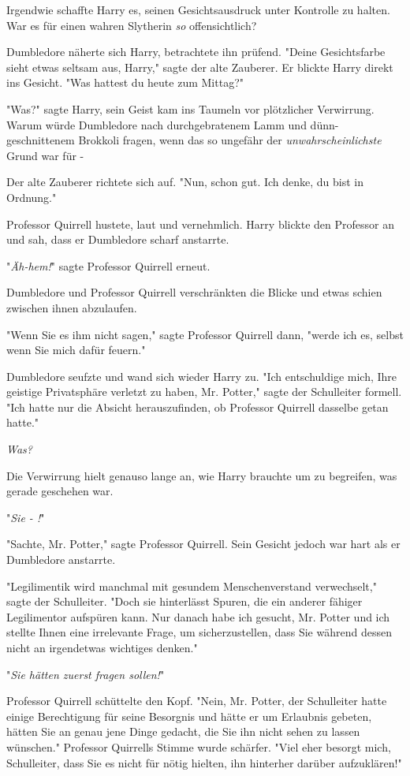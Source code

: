 {Irgendwie schaffte Harry es, seinen Gesichtsausdruck unter Kontrolle zu halten. War es für einen wahren Slytherin \emph{so} offensichtlich?

Dumbledore näherte sich Harry, betrachtete ihn prüfend. "Deine Gesichtsfarbe sieht etwas seltsam aus, Harry," sagte der alte Zauberer. Er blickte Harry direkt ins Gesicht. "Was hattest du heute zum Mittag?"

"Was?" sagte Harry, sein Geist kam ins Taumeln vor plötzlicher Verwirrung. Warum würde Dumbledore nach durchgebratenem Lamm und dünn-geschnittenem Brokkoli fragen, wenn das so ungefähr der \emph{unwahrscheinlichste} Grund war für -

Der alte Zauberer richtete sich auf. "Nun, schon gut. Ich denke, du bist in Ordnung."

Professor Quirrell hustete, laut und vernehmlich. Harry blickte den Professor an und sah, dass er Dumbledore scharf anstarrte.

"\emph{Äh-hem!}" sagte Professor Quirrell erneut.

Dumbledore und Professor Quirrell verschränkten die Blicke und etwas schien zwischen ihnen abzulaufen.

"Wenn Sie es ihm nicht sagen," sagte Professor Quirrell dann, "werde ich es, selbst wenn Sie mich dafür feuern."

Dumbledore seufzte und wand sich wieder Harry zu. "Ich entschuldige mich, Ihre geistige Privatsphäre verletzt zu haben, Mr. Potter," sagte der Schulleiter formell. "Ich hatte nur die Absicht herauszufinden, ob Professor Quirrell dasselbe getan hatte."

\emph{Was?}

Die Verwirrung hielt genauso lange an, wie Harry brauchte um zu begreifen, was gerade geschehen war.

"\emph{Sie - !}"

"Sachte, Mr. Potter," sagte Professor Quirrell. Sein Gesicht jedoch war hart als er Dumbledore anstarrte.

"Legilimentik wird manchmal mit gesundem Menschenverstand verwechselt," sagte der Schulleiter. "Doch sie hinterlässt Spuren, die ein anderer fähiger Legilimentor aufspüren kann. Nur danach habe ich gesucht, Mr. Potter und ich stellte Ihnen eine irrelevante Frage, um sicherzustellen, dass Sie während dessen nicht an irgendetwas wichtiges denken."

"\emph{Sie hätten zuerst fragen sollen!}"

Professor Quirrell schüttelte den Kopf. "Nein, Mr. Potter, der Schulleiter hatte einige Berechtigung für seine Besorgnis und hätte er um Erlaubnis gebeten, hätten Sie an genau jene Dinge gedacht, die Sie ihn nicht sehen zu lassen wünschen." Professor Quirrells Stimme wurde schärfer. "Viel eher besorgt mich, Schulleiter, dass Sie es nicht für nötig hielten, ihn hinterher darüber aufzuklären!"

}
